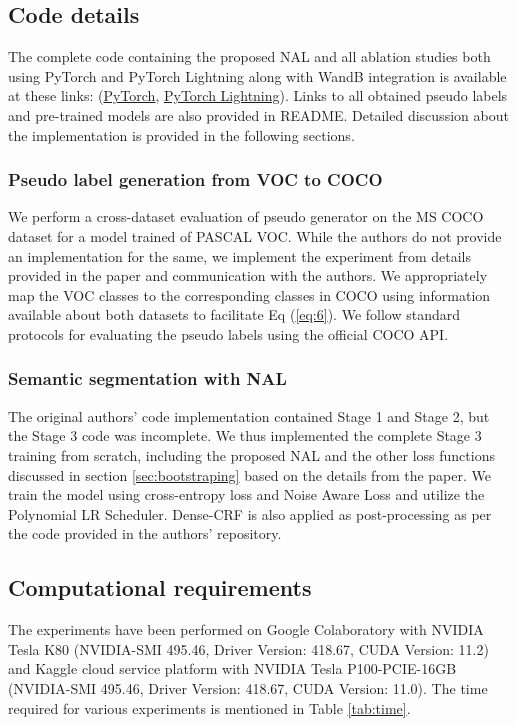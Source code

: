 
\subsection{Code details}

The complete code containing the proposed NAL and all ablation studies both using PyTorch \cite{pytorch} and PyTorch Lightning along with WandB \cite{wandb} integration is available at these links: (\href{https://github.com/karan-uppal3/BANA}{PyTorch}, \href{https://github.com/karan-uppal3/BANA/tree/Pytorch-Lightning}{PyTorch Lightning}). Links to all obtained pseudo labels and pre-trained models are also provided in README. Detailed discussion about the implementation is provided in the following sections. 

\subsubsection{Pseudo label generation from VOC to COCO}

We perform a cross-dataset evaluation of pseudo generator on the MS COCO dataset for a model trained of PASCAL VOC. While the authors do not provide an implementation for the same, we implement the experiment from details provided in the paper and communication with the authors. We appropriately map the VOC classes to the corresponding classes in COCO using information available about both datasets to facilitate Eq (\ref{eq:6}). We follow standard protocols for evaluating the pseudo labels using the official COCO API.

\subsubsection{Semantic segmentation with NAL}

The original authors' code implementation contained Stage 1 and Stage 2, but the Stage 3 code was incomplete. We thus implemented the complete Stage 3 training from scratch, including the proposed NAL and the other loss functions discussed in section \ref{sec:bootstraping} based on the details from the paper. We train the model using cross-entropy loss and Noise Aware Loss and utilize the Polynomial LR Scheduler. Dense-CRF is also applied as post-processing as per the code provided in the authors' repository.


\subsection{Computational requirements}
The experiments have been performed on Google Colaboratory with NVIDIA Tesla K80 (NVIDIA-SMI 495.46, Driver Version: 418.67, CUDA Version: 11.2) and Kaggle cloud service platform with NVIDIA Tesla P100-PCIE-16GB (NVIDIA-SMI 495.46, Driver Version: 418.67, CUDA Version: 11.0). The time required for various experiments is mentioned in Table \ref{tab:time}.

